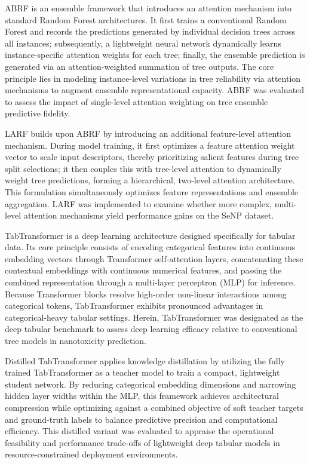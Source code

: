 ABRF is an ensemble framework that introduces an attention mechanism into standard Random Forest architectures. It first trains a conventional Random Forest and records the predictions generated by individual decision trees across all instances; subsequently, a lightweight neural network dynamically learns instance-specific attention weights for each tree; finally, the ensemble prediction is generated via an attention-weighted summation of tree outputs. The core principle lies in modeling instance-level variations in tree reliability via attention mechanisms to augment ensemble representational capacity.
ABRF was evaluated to assess the impact of single-level attention weighting on tree ensemble predictive fidelity.

LARF builds upon ABRF by introducing an additional feature-level attention mechanism. During model training, it first optimizes a feature attention weight vector to scale input descriptors, thereby prioritizing salient features during tree split selections; it then couples this with tree-level attention to dynamically weight tree predictions, forming a hierarchical, two-level attention architecture. This formulation simultaneously optimizes feature representations and ensemble aggregation.
LARF was implemented to examine whether more complex, multi-level attention mechanisms yield performance gains on the SeNP dataset.

TabTransformer is a deep learning architecture designed specifically for tabular data. Its core principle consists of encoding categorical features into continuous embedding vectors through Transformer self-attention layers, concatenating these contextual embeddings with continuous numerical features, and passing the combined representation through a multi-layer perceptron (MLP) for inference. Because Transformer blocks resolve high-order non-linear interactions among categorical tokens, TabTransformer exhibits pronounced advantages in categorical-heavy tabular settings. Herein, TabTransformer was designated as the deep tabular benchmark to assess deep learning efficacy relative to conventional tree models in nanotoxicity prediction.

Distilled TabTransformer applies knowledge distillation by utilizing the fully trained TabTransformer as a teacher model to train a compact, lightweight student network. By reducing categorical embedding dimensions and narrowing hidden layer widths within the MLP, this framework achieves architectural compression while optimizing against a combined objective of soft teacher targets and ground-truth labels to balance predictive precision and computational efficiency.
This distilled variant was evaluated to appraise the operational feasibility and performance trade-offs of lightweight deep tabular models in resource-constrained deployment environments.

